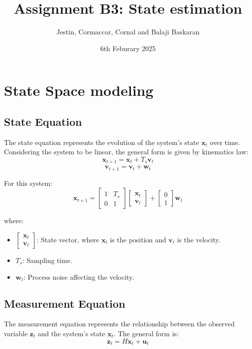 \documentclass{article}
\title{Assignment B3: State estimation}
\author{Jestin, Cormaccar, Cornal and Balaji Baskaran}
\date{6th Feburary 2025}
\begin{document}
\maketitle

\section*{State Space modeling}

\subsection*{State Equation}
The state equation represents the evolution of the system's state \( \mathbf{x}_t \) over time. Considering the system to be linear, the general form is given by kinematics law:
\[
\mathbf{x}_{t+1} = \mathbf{x}_t + T_s \mathbf{v}_{t}
\]
\[ \mathbf{v}_{t+1} = \mathbf{v}_{t} + \mathbf{w}_t\]

For this system:
\[
\mathbf{x}_{t+1} = 
\begin{bmatrix}
1 & T_s \\
0 & 1
\end{bmatrix} \begin{bmatrix}
   \mathbf{x}_t \\ \mathbf{v}_{t} 
\end{bmatrix}
 +
\begin{bmatrix}
0 \\
1
\end{bmatrix}
\mathbf{w}_{t}
\]

where:
\begin{itemize}
    \item \( \begin{bmatrix} \mathbf{x}_t \\ \mathbf{v}_{t} \end{bmatrix} \): State vector, where \( \mathbf{x}_t \) is the position and \( \mathbf{v}_{t} \) is the velocity.
    \item \( T_s \): Sampling time.
    \item \( \mathbf{w}_{t} \): Process noise affecting the velocity.
\end{itemize}

\subsection*{Measurement Equation}
The measurement equation represents the relationship between the observed variable \( \mathbf{z}_{t} \) and the system's state \( \mathbf{x}_t \). The general form is:
\[
\mathbf{z}_{t} = H \mathbf{x}_t + \mathbf{u}_{t}
\]
\end{document}
